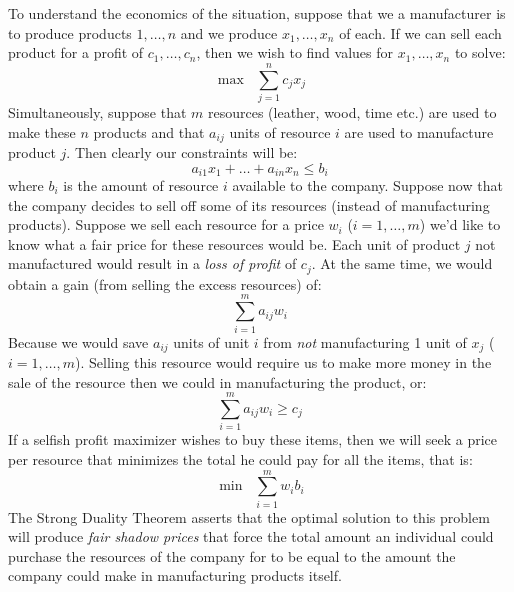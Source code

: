 To understand the economics of the situation, suppose that we a manufacturer is to produce products $1, \dots, n$ and we produce $x_1,\dots,x_n$ of each. If we can sell each product for a profit of $c_1,\dots,c_n$, then we wish to find values for $x_1,\dots,x_n$ to solve:
\begin{equation}
\max\;\;\sum_{j=1}^{n}c_j x_j
\end{equation}
Simultaneously, suppose that $m$ resources (leather, wood, time etc.) are used to make these $n$ products and that $a_{ij}$ units of resource $i$ are used to manufacture product $j$. Then clearly our constraints will be:
\begin{equation}
a_{i1}x_1 + \dots + a_{in}x_n \leq b_i
\end{equation}
where $b_i$ is the amount of resource $i$ available to the company. Suppose now that the company decides to sell off some of its resources (instead of manufacturing products). Suppose we sell each resource for a price $w_i$ ($i=1,\dots,m$) we'd like to know what a fair price for these resources would be. Each unit of product $j$ not manufactured would result in a \textit{loss of profit} of $c_j$. At the same time, we would obtain a gain (from selling the excess resources) of:
\begin{equation}
\sum_{i=1}^m a_{ij}w_i
\end{equation}
Because we would save $a_{ij}$ units of unit $i$ from \textit{not} manufacturing 1 unit of $x_j$ ($i=1,\dots,m$). Selling this resource would require us to make more money in the sale of the resource then we could in manufacturing the product, or:
\begin{equation}
\sum_{i=1}^m a_{ij}w_i \geq c_j
\end{equation} 
If a selfish profit maximizer wishes to buy these items, then we will seek a price per resource that minimizes the total he could pay for all the items, that is:
\begin{equation}
\min\;\;\sum_{i=1}^{m} w_ib_i
\end{equation}
The Strong Duality Theorem asserts that the optimal solution to this problem will produce \textit{fair shadow prices} that force the total amount an individual could purchase the resources of the company for to be equal to the amount the company could make in manufacturing products itself.

